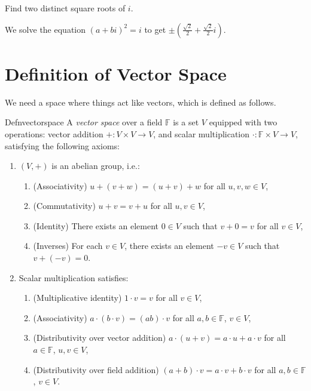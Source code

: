 \setcounter{exercise}{7}

\begin{exercise}
  Find two distinct square roots of $i$.
\end{exercise}

We solve the equation $\left(a+bi\right)^2=i$ to get $\pm\left(\frac{\sqrt{2}}{2}+\frac{\sqrt{2}}{2}i\right)$.

\section{Definition of Vector Space}

We need a space where things act like vectors, which is defined as follows.

\begin{reference}{Defn}{vectorspace}
  A \textit{vector space} over a field $\mathbb F$ is a set \( V \) equipped with two operations: vector addition \( + : V \times V \to V \), and scalar multiplication \( \cdot : \mathbb F \times V \to V \), satisfying the following axioms:
  \begin{enumerate}
    \item \((V, +)\) is an abelian group, i.e.:
          \begin{enumerate}
            \item (Associativity) \( u + (v + w) = (u + v) + w \) for all \( u, v, w \in V \),
            \item (Commutativity) \( u + v = v + u \) for all \( u, v \in V \),
            \item (Identity) There exists an element \( 0 \in V \) such that \( v + 0 = v \) for all \( v \in V \),
            \item (Inverses) For each \( v \in V \), there exists an element \( -v \in V \) such that \( v + (-v) = 0 \).
          \end{enumerate}
    \item Scalar multiplication satisfies:
          \begin{enumerate}
            \item (Multiplicative identity) \( 1 \cdot v = v \) for all \( v \in V \),
            \item (Associativity) \( a \cdot (b \cdot v) = (ab) \cdot v \) for all \( a, b \in \mathbb F \), \( v \in V \),
            \item (Distributivity over vector addition) \( a \cdot (u + v) = a \cdot u + a \cdot v \) for all \( a \in \mathbb F \), \( u, v \in V \),
            \item (Distributivity over field addition) \( (a + b) \cdot v = a \cdot v + b \cdot v \) for all \( a, b \in \mathbb F \), \( v \in V \).\qedhere
          \end{enumerate}
  \end{enumerate}
\end{reference}

